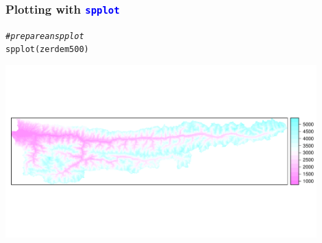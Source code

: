 \documentclass[xcolor=table, xcolor=dvipsnames]{beamer}\usepackage[]{graphicx}\usepackage[]{color}
\makeatletter
\newcommand{\hlcom}[1]{\textcolor[rgb]{0,0.392,0}{\textit{#1}}}
\newcommand{\hlstd}[1]{\textcolor[rgb]{0,0,0}{#1}}
\newcommand{\hlkwd}[1]{\textcolor[rgb]{0,0,1}{#1}}
\newenvironment{kframe}{%
 \def\at@end@of@kframe{}%
 \ifinner\ifhmode%
  \def\at@end@of@kframe{\end{minipage}}%
  \begin{minipage}{\columnwidth}%
 \fi\fi%
 \def\FrameCommand##1{\hskip\@totalleftmargin \hskip-\fboxsep
 \colorbox{shadecolor}{##1}\hskip-\fboxsep
     \hskip-\linewidth \hskip-\@totalleftmargin \hskip\columnwidth}%
 \MakeFramed {\advance\hsize-\width
   \@totalleftmargin\z@ \linewidth\hsize
   \@setminipage}}%
 {\par\unskip\endMakeFramed%
 \at@end@of@kframe}
\newenvironment{knitrout}{}{} %
\newcommand{\rcode}[1]{\texttt{\textcolor{Blue}{#1}}} %
\makeatother
\begin{document}
\begin{frame}[fragile]\frametitle{Plotting with \rcode{spplot}}
\begin{knitrout}
\color{fgcolor}\begin{kframe}
\begin{alltt}
\hlcom{# prepare an spplot}
\hlkwd{spplot}\hlstd{(zerdem500)}
\end{alltt}
\end{kframe}
\end{knitrout}
\begin{center}
\includegraphics[width=0.9\textwidth]{./externalfig/advanced_plotting_with_standard_spplot.pdf}
\end{center}
\end{frame}

\end{document}
